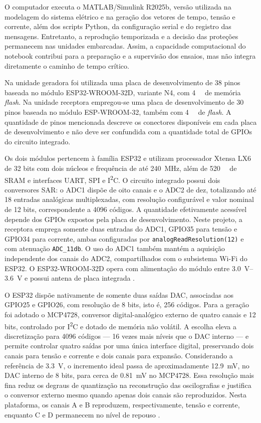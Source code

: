 O computador executa o MATLAB/Simulink R2025b, versão utilizada na modelagem do sistema elétrico e na geração dos vetores de tempo, tensão e corrente, além dos scripts Python, da configuração serial e do registro das mensagens. Entretanto, a reprodução temporizada e a decisão das proteções permanecem nas unidades embarcadas. Assim, a capacidade computacional do notebook contribui para a preparação e a supervisão dos ensaios, mas não integra diretamente o caminho de tempo crítico.

Na unidade geradora foi utilizada uma placa de desenvolvimento de 38 pinos baseada no módulo ESP32-WROOM-32D, variante N4, com \SI{4}{\mebi\byte} de memória \textit{flash}. Na unidade receptora empregou-se uma placa de desenvolvimento de 30 pinos baseada no módulo ESP-WROOM-32, também com \SI{4}{\mebi\byte} de \textit{flash}. A quantidade de pinos mencionada descreve os conectores disponíveis em cada placa de desenvolvimento e não deve ser confundida com a quantidade total de GPIOs do circuito integrado.

Os dois módulos pertencem à família ESP32 e utilizam processador Xtensa LX6 de 32 bits com dois núcleos e frequência de até \SI{240}{\mega\hertz}, além de \SI{520}{\kibi\byte} de SRAM e interfaces UART, SPI e I\textsuperscript{2}C. O circuito integrado possui dois conversores SAR: o ADC1 dispõe de oito canais e o ADC2 de dez, totalizando até 18 entradas analógicas multiplexadas, com resolução configurável e valor nominal de 12 bits, correspondente a 4096 códigos. A quantidade efetivamente acessível depende dos GPIOs expostos pela placa de desenvolvimento. Neste projeto, a receptora emprega somente duas entradas do ADC1, GPIO35 para tensão e GPIO34 para corrente, ambas configuradas por \texttt{analogReadResolution(12)} e com atenuação \texttt{ADC\_11db}. O uso do ADC1 também mantém a aquisição independente dos canais do ADC2, compartilhados com o subsistema Wi-Fi do ESP32. O ESP32-WROOM-32D opera com alimentação do módulo entre \SIrange{3,0}{3,6}{\volt} e possui antena de placa integrada \cite{espressif_wroom32d,espressif_wroom32}.

O ESP32 dispõe nativamente de somente duas saídas DAC, associadas aos GPIO25 e GPIO26, com resolução de 8 bits, isto é, 256 códigos. Para a geração foi adotado o MCP4728, conversor digital-analógico externo de quatro canais e 12 bits, controlado por I\textsuperscript{2}C e dotado de memória não volátil. A escolha eleva a discretização para 4096 códigos --- 16 vezes mais níveis que o DAC interno --- e permite controlar quatro saídas por uma única interface digital, preservando dois canais para tensão e corrente e dois canais para expansão. Considerando a referência de \SI{3,3}{\volt}, o incremento ideal passa de aproximadamente \SI{12,9}{\milli\volt}, no DAC interno de 8 bits, para cerca de \SI{0,81}{\milli\volt} no MCP4728. Essa resolução mais fina reduz os degraus de quantização na reconstrução das oscilografias e justifica o conversor externo mesmo quando apenas dois canais são reproduzidos. Nesta plataforma, os canais A e B reproduzem, respectivamente, tensão e corrente, enquanto C e D permanecem no nível de repouso \cite{microchip_mcp4728}.

